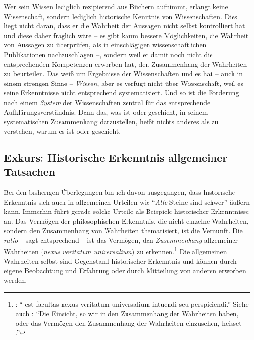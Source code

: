Wer sein Wissen lediglich rezipierend aus Büchern aufnimmt, erlangt keine
Wissenschaft, sondern lediglich historische Kenntnis von Wissenschaften. Dies
liegt nicht daran, dass er die Wahrheit der Aussagen nicht selbst kontrolliert hat und diese
daher fraglich wäre -- es gibt kaum bessere Möglichkeiten, die Wahrheit von
Aussagen zu überprüfen, als in einschlägigen wissenschaftlichen Publikationen
nachzuschlagen --, sondern weil er damit noch nicht die entsprechenden
Kompetenzen erworben hat, den Zusammenhang der Wahrheiten zu beurteilen. Das
 weiß um Ergebnisse der Wissenschaften und es hat --
auch in einem strengen Sinne -- \emph{Wissen}, aber es verfügt nicht über
Wissenschaft, weil es seine Erkenntnisse nicht entsprechend systematisiert. Und
so ist die Forderung nach einem \emph{System} der Wissenschaften zentral für das
entsprechende Aufklärungsverständnis. Denn das, was ist oder geschieht, in
seinem systematischen Zusammenhang darzustellen, heißt nichts anderes als zu
verstehen, warum es ist oder geschieht.

\subsection{Exkurs: Historische Erkenntnis allgemeiner
Tatsachen}\label{subsubsection:HistorischeErkenntnisallgemeinerTatsachen}
Bei den bisherigen Überlegungen bin ich davon ausgegangen, dass
historische Erkenntnis sich auch in allgemeinen Urteilen wie \enquote{\emph{Alle} Steine
sind schwer} äußern kann. Immerhin führt
 gerade solche Urteile als Beispiele
historischer Erkenntnisse an. Das Vermögen der philosophischen Erkenntnis, die
nicht einzelne Wahrheiten, sondern den Zusammenhang von Wahrheiten thematisiert, ist die Vernunft. Die
\emph{ratio} -- sagt  entsprechend -- ist das Vermögen, den
\emph{Zusammenhang} allgemeiner Wahrheiten (\emph{nexus veritatum universalium})
zu
erkennen.\footnote{\label{Anmerkung:Wolff:VernunftalsEinsichtinZusammenhangallgemeinerWahrheiten}\cite[Vgl.][\S~483]{Wolff:Psychologiaempirica1968}:
\enquote{ est facultas nexus veritatum universalium intuendi seu
perspiciendi.} Siehe auch
\cite[][\S~368]{Wolff:VernuenftigeGedanckenvonGottderWeltundderSeeledesMenschenauchallenDingenueberhauptDeutscheMetaphysik1983}:
\enquote{Die Einsicht, so wir in den Zusammenhang der Wahrheiten haben, oder
das Vermögen den Zusammenhang der Wahrheiten einzusehen, heisset
.}} Die allgemeinen
Wahrheiten selbst sind Gegenstand historischer Erkenntnis und können durch
eigene Beobachtung und Erfahrung oder durch Mitteilung von anderen erworben
werden.


